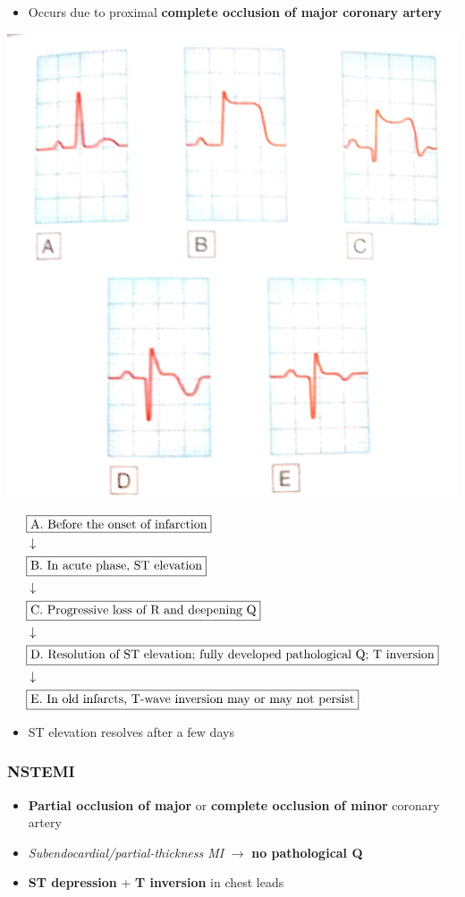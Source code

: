 \documentclass[
  12pt,
]{memoir}
\providecommand{\tightlist}{%
  \setlength{\itemsep}{0pt}\setlength{\parskip}{0pt}}
\begin{document}
\begin{itemize}
\tightlist
\item
  Occurs due to proximal \textbf{complete occlusion of major coronary
  artery}
\end{itemize}

\includegraphics[width=.5\textwidth]{../assets/STEMI.jpg}

\[
\begin{aligned}
&\fbox{A. Before the onset of infarction}\\
&\downarrow\\
&\fbox{B. In acute phase, ST elevation}\\
&\downarrow\\
&\fbox{C. Progressive loss of R and deepening Q}\\
&\downarrow\\
&\fbox{D. Resolution of ST elevation; fully developed pathological Q;
T inversion}\\
&\downarrow\\
&\fbox{E. In old infarcts, T-wave inversion may or may not persist}\\
\end{aligned}
\]

\begin{itemize}
\tightlist
\item
  ST elevation resolves after a few days
\end{itemize}

\pagebreak

\hypertarget{nstemi}{%
\subsubsection{NSTEMI}\label{nstemi}}

\begin{itemize}
\tightlist
\item
  \textbf{Partial occlusion of major} or \textbf{complete occlusion of
  minor} coronary artery
\item
  \emph{Subendocardial/partial-thickness MI} \(\rightarrow\) \textbf{no
  pathological Q}
\item
  \textbf{ST depression} + \textbf{T inversion} in chest leads
\end{itemize}
\end{document}
